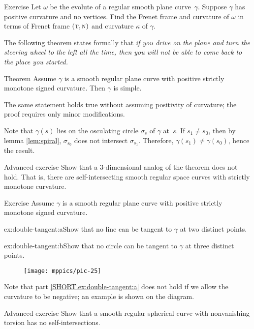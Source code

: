 \begin{thm}{Exercise}\label{ex:evolute}
Let $\omega$ be the evolute of a regular smooth plane curve~$\gamma$.
Suppose $\gamma$ has positive curvature and no vertices.
Find the Frenet frame and curvature of \(\omega\) in terms of Frenet frame $(\text{\sc{t}},\text{\sc{n}})$ and curvature $\kappa$ of \(\gamma\).
\end{thm}

The following theorem states formally that 
\textit{if you drive on the plane and turn the steering wheel to the left all the time,
then you will not be able to come back to the place you started.}


\begin{thm}{Theorem}\label{thm:spiral}
Assume $\gamma$ is a smooth regular plane curve with positive strictly monotone signed curvature. 
Then $\gamma$ is simple.
\end{thm}

The same statement holds true without assuming positivity of curvature; the proof requires only minor modifications.

Note that $\gamma(s)$ lies on the osculating circle $\sigma_s$ of $\gamma$ at~$s$.
If $s_1\ne s_0$, then by lemma \ref{lem:spiral}, $\sigma_{s_0}$ does not intersect $\sigma_{s_1}$.
Therefore, $\gamma(s_1)\ne \gamma(s_0)$,
hence the result.\qeds

\begin{thm}{Advanced exercise}\label{ex:3D-spiral}
Show that a 3-dimensional analog of the theorem does not hold.
That is, there are self-intersecting smooth regular space curves with strictly monotone curvature.
\end{thm}

\begin{thm}{Exercise}\label{ex:double-tangent}
Assume $\gamma$ is a smooth regular plane curve with positive strictly monotone signed curvature.

\begin{subthm}{ex:double-tangent:a}Show that no line can be tangent to $\gamma$ at two distinct points.
\end{subthm}

\begin{subthm}{ex:double-tangent:b}Show that no circle can be tangent to $\gamma$ at three distinct points. 
\end{subthm}

\end{thm}

{

\begin{wrapfigure}{o}{25 mm}
\vskip-4mm
\centering
\texttt{[image: mppics/pic-25]}
\vskip0mm
\end{wrapfigure}

Note that part \ref{SHORT.ex:double-tangent:a} does not hold if we allow the curvature to be negative; an example is shown on the diagram.

}

\begin{thm}{Advanced exercise}\label{ex:spherical-spiral}
Show that a smooth regular spherical curve with nonvanishing torsion has no self-intersections.
\end{thm}



